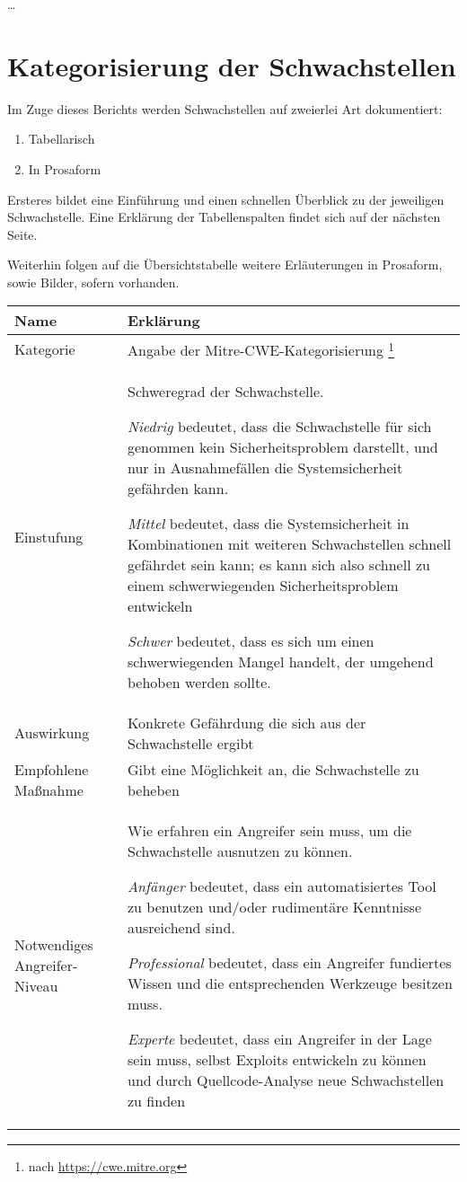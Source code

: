 \documentclass[a4paper, 12pt]{report}
\begin{document}
\ldots

\chapter{Kategorisierung der Schwachstellen}

Im Zuge dieses Berichts werden Schwachstellen auf zweierlei Art dokumentiert:
\begin{enumerate}
    \item Tabellarisch
    \item In Prosaform
\end{enumerate}

Ersteres bildet eine Einführung und einen schnellen Überblick zu der jeweiligen Schwachstelle.
Eine Erklärung der Tabellenspalten findet sich auf der nächsten Seite.

Weiterhin folgen auf die Übersichtstabelle weitere Erläuterungen in Prosaform, sowie Bilder, sofern vorhanden.

\begin{center}
    \begin{tabularx}{\textwidth}{ | X | X | }
        \hline
        \rowcolor{lightgray} \textbf{Name} & \textbf{Erklärung} \\
        \hline
        Kategorie & Angabe der Mitre-CWE-Kategorisierung \footnote{nach \url{https://cwe.mitre.org}} \\
        \hline
        Einstufung & Schweregrad der Schwachstelle.
        
        \emph{Niedrig} bedeutet, dass die Schwachstelle für sich genommen kein Sicherheitsproblem darstellt,
        und nur in Ausnahmefällen die Systemsicherheit gefährden kann.
        
        \emph{Mittel} bedeutet, dass die Systemsicherheit in Kombinationen mit weiteren Schwachstellen schnell
        gefährdet sein kann; es kann sich also schnell zu einem schwerwiegenden Sicherheitsproblem entwickeln
        
        \emph{Schwer} bedeutet, dass es sich um einen schwerwiegenden Mangel handelt, der umgehend behoben werden sollte. \\
        \hline
        Auswirkung & Konkrete Gefährdung die sich aus der Schwachstelle ergibt \\
        \hline
        Empfohlene Maßnahme & Gibt eine Möglichkeit an, die Schwachstelle zu beheben \\
        \hline
        Notwendiges Angreifer-Niveau & Wie erfahren ein Angreifer sein muss, um die Schwachstelle ausnutzen zu können.
        
        \emph{Anfänger} bedeutet, dass ein automatisiertes Tool zu benutzen und/oder rudimentäre Kenntnisse ausreichend sind.

        \emph{Professional} bedeutet, dass ein Angreifer fundiertes Wissen und die entsprechenden Werkzeuge besitzen muss.
        
        \emph{Experte} bedeutet, dass ein Angreifer in der Lage sein muss, selbst Exploits entwickeln zu können und durch Quellcode-Analyse neue Schwachstellen zu finden \\
        \hline
    \end{tabularx}
\end{center}
\end{document}
